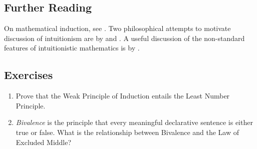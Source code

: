 {\small
\subsection*{Further Reading}

On mathematical induction, see  \citet{macsetthl}. Two philosophical attempts to motivate discussion of intuitionism are by \citet{heyintin} and \citet{dumphibai}. A useful discussion of the non-standard features of intuitionistic mathematics is by \citet{int}. 



\subsection*{Exercises}

\begin{enumerate}
\item Prove that the Weak Principle of Induction entails the Least Number Principle.

\item \emph{Bivalence} is the principle that every meaningful declarative sentence is either true or false. What is the relationship between Bivalence and the Law of Excluded Middle? 


\end{enumerate}
}







